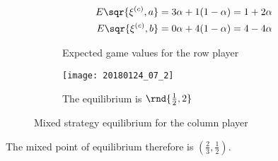 \documentclass[\main/main.tex]{subfiles}
\begin{document}
\begin{figure}
	\begin{subfigure}{0.49\textwidth}
		\begin{align*}
			E\sqr{\xi^{(c)}, a} & = 3\alpha + 1(1-\alpha) = 1+2\alpha  \\
			E\sqr{\xi^{(c)}, b} & = 0\alpha + 4(1-\alpha) = 4 -4\alpha
		\end{align*}
		\caption{Expected game values for the row player}
	\end{subfigure}
	\begin{subfigure}{0.49\textwidth}
		\texttt{[image: 20180124\_07\_2]}
		\caption{The equilibrium is $\rnd{\frac{1}{2}, 2}$}
	\end{subfigure}
	\caption{Mixed strategy equilibrium for the column player}
\end{figure}

The mixed point of equilibrium therefore is $(\frac{2}{3}, \frac{1}{2})$.
\end{document}
